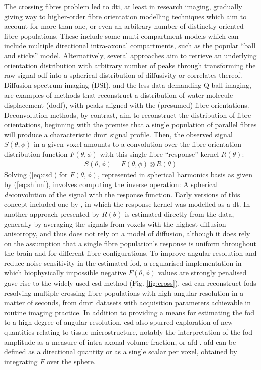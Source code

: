 The crossing fibres problem led to \gls{dti}, at least in research imaging, gradually giving way to higher-order fibre orientation modelling techniques which aim to account for more than one, or even an arbitrary number of distinctly oriented fibre populations\autocite{Alexander2005}.
These include some multi-compartment models which can include multiple directional intra-axonal compartments, such as the popular ``ball and sticks'' model\autocite{Behrens2003,Behrens2007}.
Alternatively, several approaches aim to retrieve an underlying orientation distribution with arbitrary number of peaks through transforming the raw signal \gls{odf} into a spherical distribution of diffusivity or correlates thereof.
Diffusion spectrum imaging (DSI)\autocite{Wedeen2008}, and the less data-demanding Q-ball imaging\autocite{Tuch2003,Tuch2004}, are examples of methods that reconstruct a distribution of water molecule displacement (\gls{dodf}), with peaks aligned with the (presumed) fibre orientations.
Deconvolution methods, by contrast, aim to reconstruct the distribution of fibre orientations, beginning with the premise that a single population of parallel fibres will produce a characteristic \gls{dmri} signal profile.
Then, the observed signal $S(\theta,\phi)$ in a given voxel amounts to a convolution over the fibre orientation distribution function $F(\theta,\phi)$ with this single fibre ``response'' kernel $R(\theta)$:
\begin{align}
  S(\theta,\phi) = F(\theta,\phi) \otimes R(\theta)\label{eq:csd}
\end{align}
Solving (\ref{eq:csd}) for $F(\theta,\phi)$, represented in spherical harmonics basis as given by (\ref{eq:shfun}), involves computing the inverse operation:
A spherical \textit{de}convolution of the signal with the response function.
Early versions of this concept included one by \textcite{Anderson2005}, in which the response kernel was modelled as a \gls{dt}.
In another approach presented by \textcite{Tournier2004} $R(\theta)$ is estimated directly from the data, generally by averaging the signals from voxels with the highest diffusion anisotropy, and thus does not rely on a model of diffusion, although it does rely on the assumption that a single fibre population's response is uniform throughout the brain and for different fibre configurations.
To improve angular resolution and reduce noise sensitivity in the estimated \gls{fod}, a regularised implementation in which biophysically impossible negative $F(\theta,\phi)$ values are strongly penalised gave rise to the widely used \gls{csd} method (Fig. \ref{fig:cross}).
\Gls{csd} can reconstruct \glspl{fod} resolving multiple crossing fibre populations with high angular resolution in a matter of seconds, from \gls{dmri} datasets with acquisition parameters achievable in routine imaging practice\autocite{Tournier2013}.
In addition to providing a means for estimating the \gls{fod} to a high degree of angular resolution, \gls{csd} also spurred exploration of new quantities relating to tissue microstructure, notably the interpretation of the \gls{fod} amplitude as a measure of intra-axonal volume fraction, or \gls{afd} \autocite{Raffelt2012a}.
\Gls{afd} can be defined as a directional quantity or as a single scalar per voxel, obtained by integrating $F$ over the sphere.

